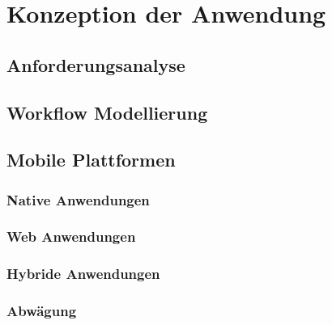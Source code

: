 \chapter{Konzeption der Anwendung}\label{chapter_3}

\section{Anforderungsanalyse}
\section{Workflow Modellierung}

\section{Mobile Plattformen}
\subsection{Native Anwendungen}
\subsection{Web Anwendungen}
\subsection{Hybride Anwendungen}
\subsection{Abwägung}
